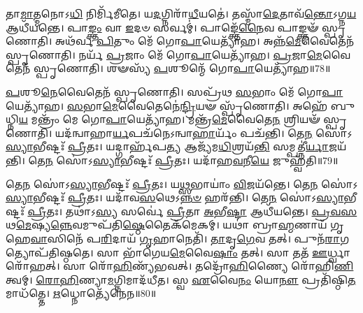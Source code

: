 𑌤𑌾\-\ul{𑌮𑌾}\-𑌤𑍍𑌮𑌨𑍋𑌽\-\ul{𑌧𑌿} 𑌨𑌿𑌰𑍍𑌮𑌿᳴𑌮𑍀𑌤𑍇।
𑌯\-\ul{𑌦}\-𑌗𑍍𑌨𑌿𑌰𑌾᳴\-\ul{𑌧𑍀}\-𑌯𑌤𑍇॑।
𑌤𑌸𑍍𑌮𑌾᳴\-\ul{𑌦𑍇}\-𑌤𑌾𑌵᳴\-\ul{𑌨𑍍𑌤𑍋}\-\-𑌽𑌗𑍍𑌨\-\ul{𑌯} 𑌆𑌧𑍀᳴𑌯𑌨𑍍𑌤𑍇।
𑌪𑌾\-\ul{𑌙𑍍𑌕𑍍𑌤𑌂} 𑌵𑌾 \ul{𑌇}\-𑌦𑍞 𑌸𑌰𑍍𑌵𑌮𑍍॑।
𑌪𑌾𑌙𑍍𑌕𑍍𑌤𑍇᳴\-\ul{𑌨𑍈}\-𑌵 𑌪𑌾𑌙𑍍𑌕𑍍𑌤𑍟᳴ 𑌸𑍍𑌪𑍃𑌣𑍋𑌤𑌿।
𑌅𑌥᳴𑌰𑍍𑌵 \ul{𑌪𑌿}\-𑌤𑍁𑌂 𑌮𑍇᳴ 𑌗𑍋\-\ul{𑌪𑌾}\-𑌯𑍇𑌤𑍍𑌯𑌾᳴𑌹।
𑌅𑌨𑍍𑌨᳴\-\ul{𑌮𑍇}\-𑌵𑍈𑌤𑍇𑌨᳴ 𑌸𑍍𑌪𑍃𑌣𑍋𑌤𑌿।
𑌨𑌰𑍍𑌯᳴ \ul{𑌪𑍍𑌰}\-𑌜𑌾𑌂 𑌮𑍇᳴ 𑌗𑍋\-\ul{𑌪𑌾}\-𑌯𑍇𑌤𑍍𑌯𑌾᳴𑌹।
\-\ul{𑌪𑍍𑌰}\-𑌜𑌾\-\ul{𑌮𑍇}\-𑌵𑍈𑌤𑍇𑌨᳴ 𑌸𑍍𑌪𑍃𑌣𑍋𑌤𑌿।
𑌶𑍟𑌸𑍍𑌯᳴ \ul{𑌪}\-𑌶𑍂𑌨𑍍𑌮𑍇᳴ 𑌗𑍋\-\ul{𑌪𑌾}\-𑌯𑍇𑌤𑍍𑌯𑌾᳴𑌹॥78॥

\-\ul{𑌪}\-𑌶𑍂\-\ul{𑌨𑍇}\-𑌵𑍈𑌤𑍇𑌨᳴ 𑌸𑍍𑌪𑍃𑌣𑍋𑌤𑌿।
𑌸𑌪𑍍𑌰᳴𑌥 \ul{𑌸}\-𑌭𑌾𑌂 𑌮𑍇᳴ 𑌗𑍋\-\ul{𑌪𑌾}\-𑌯𑍇𑌤𑍍𑌯𑌾᳴𑌹।
\-\ul{𑌸}\-𑌭𑌾\-\ul{𑌮𑍇}\-𑌵𑍈𑌤𑍇𑌨𑍇॑\-\ul{𑌨𑍍𑌦𑍍𑌰𑌿}\-𑌯𑍟 𑌸𑍍𑌪𑍃᳴𑌣𑍋𑌤𑌿।
𑌅𑌹𑍇᳴ 𑌬𑍁𑌧𑍍𑌨𑌿\-\ul{𑌯} 𑌮𑌨𑍍𑌤𑍍𑌰𑌂᳴ 𑌮𑍇 𑌗𑍋\-\ul{𑌪𑌾}\-𑌯𑍇𑌤𑍍𑌯𑌾᳴𑌹।
𑌮𑌨𑍍𑌤𑍍𑌰᳴\-\ul{𑌮𑍇}\-𑌵𑍈𑌤𑍇\-\ul{𑌨} 𑌶𑍍𑌰𑌿𑌯𑍟᳴ 𑌸𑍍𑌪𑍃𑌣𑍋𑌤𑌿।
𑌯𑌦᳴𑌨𑍍𑌵𑌾𑌹𑌾\-\ul{𑌰𑍍𑌯}\-𑌪𑌚᳴𑌨𑍇\-𑌽𑌨𑍍𑌵𑌾\-\ul{𑌹𑌾}\-𑌰𑍍𑌯𑌂᳴ 𑌪𑌚᳴𑌨𑍍𑌤𑌿।
𑌤𑍇\-\ul{𑌨} 𑌸𑍋॑\-𑌽\-\ul{𑌸𑍍𑌯𑌾}\-𑌭𑍀𑌷𑍍𑌟𑌃᳴ \ul{𑌪𑍍𑌰𑍀}\-𑌤𑌃।
𑌯𑌦𑍍𑌗𑌾𑌰𑍍\mbox{}𑌹᳴𑌪\-\ul{𑌤𑍍𑌯} 𑌆𑌜𑍍𑌯᳴𑌮\-\ul{𑌧𑌿}\-𑌶𑍍𑌰𑌯᳴\-\ul{𑌨𑍍𑌤𑌿} 𑌸𑌮𑍍𑌪𑌤𑍍𑌨𑍀॑\-\ul{𑌰𑍍𑌯𑌾}\-𑌜𑌯᳴𑌨𑍍𑌤𑌿।
𑌤𑍇\-\ul{𑌨} 𑌸𑍋॑\-𑌽\-\ul{𑌸𑍍𑌯𑌾}\-𑌭𑍀𑌷𑍍𑌟𑌃᳴ \ul{𑌪𑍍𑌰𑍀}\-𑌤𑌃।
𑌯𑌦𑌾᳴𑌹\-\ul{𑌵}\-𑌨𑍀\-\ul{𑌯𑍇} 𑌜𑍁𑌹𑍍𑌵᳴𑌤𑌿॥79॥

𑌤𑍇\-\ul{𑌨} 𑌸𑍋॑\-𑌽\-\ul{𑌸𑍍𑌯𑌾}\-𑌭𑍀𑌷𑍍𑌟𑌃᳴ \ul{𑌪𑍍𑌰𑍀}\-𑌤𑌃।
𑌯\-\ul{𑌥𑍍𑌸}\-𑌭𑌾𑌯𑌾𑌂॑ \ul{𑌵𑌿}\-𑌜𑌯᳴𑌨𑍍𑌤𑍇।
𑌤𑍇\-\ul{𑌨} 𑌸𑍋॑\-𑌽\-\ul{𑌸𑍍𑌯𑌾}\-𑌭𑍀𑌷𑍍𑌟𑌃᳴ \ul{𑌪𑍍𑌰𑍀}\-𑌤𑌃।
𑌯𑌦𑌾᳴𑌵\-\ul{𑌸}\-𑌥𑍇\-𑌽\-\ul{𑌨𑍍𑌨}\-\-\ul{𑍞} 𑌹𑌰᳴𑌨𑍍𑌤𑌿।
𑌤𑍇\-\ul{𑌨} 𑌸𑍋॑\-𑌽\-\ul{𑌸𑍍𑌯𑌾}\-𑌭𑍀𑌷𑍍𑌟𑌃᳴ \ul{𑌪𑍍𑌰𑍀}\-𑌤𑌃।
𑌤𑌥𑌾॑𑌽\-\ul{𑌸𑍍𑌯} 𑌸𑌰𑍍𑌵𑍇॑ \ul{𑌪𑍍𑌰𑍀}\-𑌤𑌾 \ul{𑌅}\-𑌭𑍀\-\ul{𑌷𑍍𑌟𑌾} 𑌆𑌧𑍀᳴𑌯𑌨𑍍𑌤𑍇।
\-\ul{𑌪𑍍𑌰}\-\-\ul{𑌵}\-\-\ul{𑌸}\-𑌥\-\ul{𑌮𑍇}\-𑌷𑍍𑌯\-\ul{𑌨𑍍𑌨𑍇}\-𑌵𑌮𑍁𑌪᳴𑌤𑌿\-\ul{𑌷𑍍𑌠𑍇}\-𑌤𑍈𑌕᳴𑌮𑍇𑌕𑌮𑍍।
𑌯𑌥𑌾॑ 𑌬𑍍𑌰𑌾\-\ul{𑌹𑍍𑌮}\-𑌣𑌾𑌯᳴ 𑌗𑍃𑌹𑍇\-\ul{𑌵𑌾}\-𑌸𑌿𑌨𑍇᳴ 𑌪\-\ul{𑌰𑌿}\-𑌦𑌾𑌯᳴ \ul{𑌗𑍃}\-𑌹𑌾𑌨𑍇𑌤𑌿᳴।
\-\ul{𑌤𑌾}\-𑌦𑍃\-\ul{𑌗𑍇}\-𑌵 𑌤𑌤𑍍।
𑌪𑍁𑌨᳴\-\ul{𑌰𑌾}\-𑌗𑌤𑍍𑌯𑍋𑌪᳴𑌤𑌿𑌷𑍍𑌠𑌤𑍇।
𑌸𑌾 𑌭𑌾᳴𑌗𑍇𑌯\-\ul{𑌮𑍇}\-𑌵𑍈\-\ul{𑌷𑌾𑌂} 𑌤𑌤𑍍।
𑌸𑌾 𑌤𑌤᳴ \ul{𑌊}\-𑌰𑍍𑌧𑍍𑌵𑌾𑌰𑍋᳴𑌹𑌤𑍍।
𑌸𑌾 𑌰𑍋᳴\-\ul{𑌹𑌿}\-𑌣𑍍𑌯᳴𑌭𑌵𑌤𑍍।
𑌤𑌦𑍍𑌰𑍋᳴\-\ul{𑌹𑌿}\-𑌣𑍍𑌯𑍈 𑌰𑍋᳴𑌹𑌿\-\ul{𑌣𑌿}\-𑌤𑍍𑌵𑌮𑍍।
\-\ul{𑌰𑍋}\-\-\ul{𑌹𑌿}\-𑌣𑍍𑌯𑌾\-\ul{𑌮}\-𑌗𑍍𑌨𑌿𑌮𑌾𑌦᳴𑌧𑍀𑌤।
𑌸𑍍𑌵 \ul{𑌏}\-𑌵𑍈\-\ul{𑌨𑌂} 𑌯𑍋\-\ul{𑌨𑍗} 𑌪𑍍𑌰𑌤𑌿᳴\-𑌷𑍍𑌠𑌿\-\ul{𑌤}\-𑌮𑌾𑌧᳴𑌤𑍍𑌤𑍇।
\-\ul{𑌋}\-𑌧𑍍𑌨𑍋𑌤𑍍𑌯𑍇᳴𑌨𑍇𑌨॥80॥\anuvakamend[\-\ul{𑌏}\-𑌷𑌾 \ul{𑌪}\-𑌶𑍂𑌨𑍍𑌮𑍇᳴ 𑌗𑍋\-\ul{𑌪𑌾}\-𑌯𑍇\-\ul{𑌤𑌿} 𑌪𑍍𑌰𑌵𑌿᳴𑌷𑍍𑌟𑌾 \ul{𑌪}\-𑌶𑍂𑌨𑍍𑌮𑍇᳴ 𑌗𑍋\-\ul{𑌪𑌾}\-𑌯𑍇𑌤𑍍𑌯𑌾᳴\-\ul{𑌹} 𑌜𑍁𑌹𑍍𑌵᳴𑌤𑌿 𑌤𑌿𑌷𑍍𑌠𑌤𑍇 \ul{𑌸}\-𑌪𑍍𑌤 𑌚᳴]





\clearpage
{}
\setcounter{anuvakam}{0}

